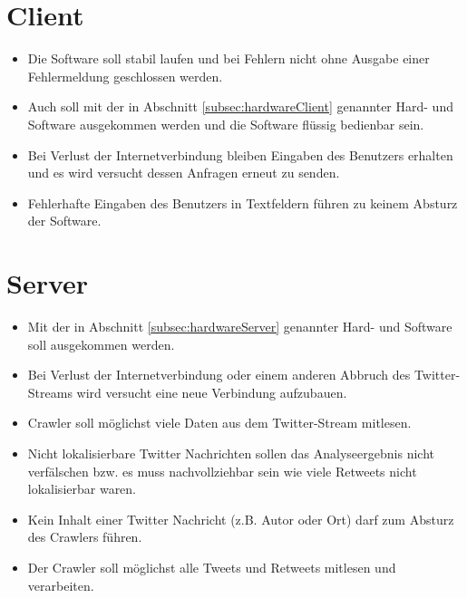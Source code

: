 
\section{Client}
\begin{itemize}
	\item Die Software soll stabil laufen und bei Fehlern nicht ohne Ausgabe einer Fehlermeldung geschlossen werden.
	\item Auch soll mit der in Abschnitt \ref{subsec:hardwareClient} genannter Hard- und Software ausgekommen werden und die Software flüssig bedienbar sein.
	\item Bei Verlust der Internetverbindung bleiben Eingaben des Benutzers erhalten und es wird versucht dessen Anfragen erneut zu senden.
	\item Fehlerhafte Eingaben des Benutzers in Textfeldern führen zu keinem Absturz der Software.
\end{itemize}
\section{Server}
\begin{itemize}
	\item Mit der in Abschnitt \ref{subsec:hardwareServer} genannter Hard- und Software soll ausgekommen werden.
	\item Bei Verlust der Internetverbindung oder einem anderen Abbruch des Twitter-Streams wird versucht eine neue Verbindung aufzubauen.
	\item Crawler soll möglichst viele Daten aus dem Twitter-Stream mitlesen.
	\item Nicht lokalisierbare Twitter Nachrichten sollen das Analyseergebnis nicht verfälschen bzw. es muss nachvollziehbar sein wie viele Retweets nicht lokalisierbar waren.
	\item Kein Inhalt einer Twitter Nachricht (z.B. Autor oder Ort) darf zum Absturz des Crawlers führen.
	\item Der Crawler soll möglichst alle Tweets und Retweets mitlesen und verarbeiten.
\end{itemize}
